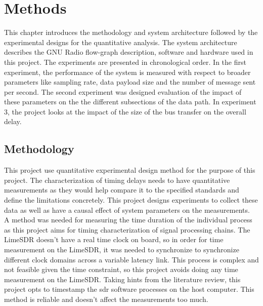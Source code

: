 \chapter{Methods}
This chapter introduces the methodology and system architecture followed by the experimental designs for the quantitative analysis.
The system architecture describes the GNU Radio flow-graph description, software and hardware used in this project. The experiments are presented in chronological order. In the first experiment, the performance of the system is measured with respect to broader parameters like sampling rate, data payload size and the number of message sent per second. The second experiment was designed evaluation of the impact of these parameters on the the different subsections of the data path. In experiment 3, the project looks at the impact of the size of the bus transfer on the overall delay.

\section{Methodology}
This project use quantitative experimental design method for the purpose of this project.
The characterization of timing delays needs to have quantitative measurements as they would help compare it to the specified standards and define the limitations concretely.
This project designs experiments to collect these data as well as have a causal effect of system parameters on the measurements.\\

A method was needed for measuring the time duration of the individual process as this project aims for timing characterization of signal processing chains.
The LimeSDR doesn't have a real time clock on board, so in order for time measurement on the LimeSDR, it was needed to synchronize to synchronize different clock domains across a variable latency link.
This process is complex and not feasible given the time constraint, so this project avoids doing any time measurement on the LimeSDR.
Taking hints from the literature review, this project opts to timestamp the \ac{sdr} software processes on the host computer.
This method is reliable and doesn't affect the measurements too much.\\

